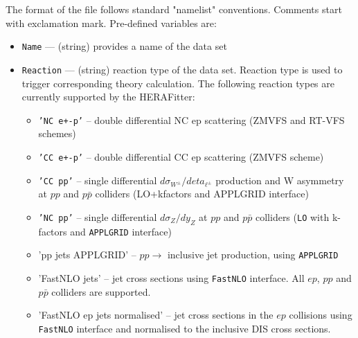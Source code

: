    The format of the file follows standard "namelist" conventions. Comments 
   start with exclamation mark.  Pre-defined variables are:
\begin{itemize}
     \item{\tt Name}        --- (string) provides a name of the data set
    \item{\tt  Reaction}    --- (string) reaction type of the data set. Reaction type is used 
                      to trigger corresponding theory calculation. The following 
                      reaction types  are currently supported by the HERAFitter:
                      \begin{itemize}
                        \item {\tt 'NC e+-p'}  -- double differential NC ep scattering
                                      (ZMVFS and RT-VFS schemes) 
                        \item {\tt 'CC e+-p'}  -- double differential CC ep scattering
                                      (ZMVFS scheme)
                        \item {\tt 'CC pp'}    -- single differential $d \sigma_{W^{\pm}}/d eta_{\ell^{\pm}}$
                                      production and W asymmetry at $pp$ and $p\bar{p}$ 
                                      colliders (LO+kfactors and APPLGRID interface)
                        \item {\tt 'NC pp'}    -- single differential $d \sigma_Z / d y_Z$ at $pp$ and
                                      $p\bar{p}$ colliders
                                      ({\tt LO} with k-factors and {\tt APPLGRID} interface)

                        \item 'pp jets APPLGRID' -- $pp\to$ inclusive jet production, using
                                     {\tt APPLGRID}

                        \item 'FastNLO jets' -- jet cross sections using {\tt FastNLO} interface.
                                     All $ep$, $pp$ and $p\bar{p}$ colliders are supported.

                        \item 'FastNLO ep jets normalised' -- jet cross sections in the $ep$ collisions 
                                     using {\tt FastNLO} interface and normalised to the inclusive DIS cross sections.


\end{itemize}
\end{itemize}
